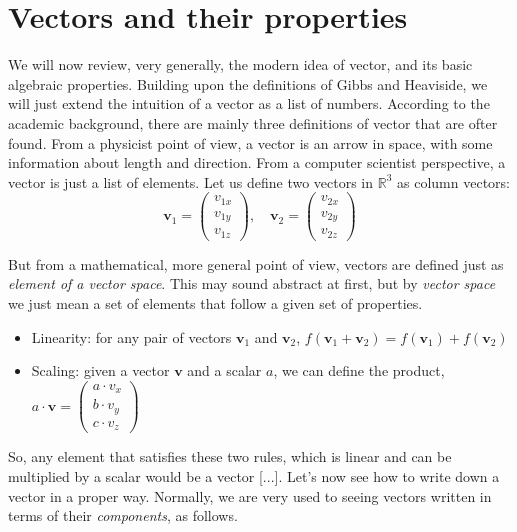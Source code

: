 \documentclass{book}
\begin{document}
\newpage

\section{Vectors and their properties}

We will now review, very generally, the modern idea of vector, and its basic algebraic properties. Building upon the definitions of Gibbs and Heaviside, we will just extend the intuition of a vector as a list of numbers. According to the academic background, there are mainly three definitions of vector that are ofter found. From a physicist point of view, a vector is an arrow in space, with some information about length and direction. From a computer scientist perspective, a vector is just a list of elements. Let us define two vectors in \( \mathbb{R}^3 \) as column vectors:
\begin{equation}
	\mathbf{v}_1 = \begin{pmatrix} v_{1x} \\ v_{1y} \\ v_{1z} \end{pmatrix}, \quad
	\mathbf{v}_2 = \begin{pmatrix} v_{2x} \\ v_{2y} \\ v_{2z} \end{pmatrix}
\end{equation}

But from a mathematical, more general point of view, vectors are defined just as \textit{element of a vector space}. This may sound abstract at first, but by \textit{vector space} we just mean a set of elements that follow a given set of properties.

\begin{itemize}
\item Linearity: for any pair of vectors $\mathbf{v}_1$ and  $\mathbf{v}_2$, $f(\mathbf{v}_1 + \mathbf{v}_2) =  f(\mathbf{v}_1) + f(\mathbf{v}_2)$
\item Scaling: given a vector $\mathbf{v}$ and a scalar $a$, we can define the product, $a \cdot \mathbf{v} = \begin{pmatrix} a \cdot v_{x} \\ b \cdot v_{y} \\ c \cdot v_{z} \end{pmatrix}$
\end{itemize}

So, any element that satisfies these two rules, which is linear and can be multiplied by a scalar would be a vector [...]. Let's now see how to write down a vector in a proper way. Normally, we are very used to seeing vectors written in terms of their \textit{components}, as follows.
\end{document}
